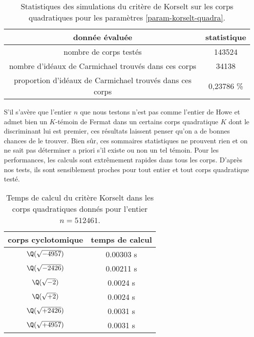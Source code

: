 \begin{table}[H]
	\begin{center}
		\begin{tabular}{|c|c|}
			\hline
			donnée évaluée & statistique \\
			\hline
			\hline
			nombre de corps testés & 143524 \\\hline
			nombre d'idéaux de Carmichael trouvés dans ces corps & 34138 \\\hline
			proportion d'idéaux de Carmichael trouvés dans ces corps & 0,23786 \% \\\hline
		\end{tabular}
		\caption{Statistiques des simulations du critère de Korselt sur les corps quadratiques pour les paramètres \ref{param-korselt-quadra}.}
	\end{center}
\end{table}

S'il s'avère que l'entier $n$ que nous testons n'est pas comme l'entier de Howe et admet bien un $K$-témoin de Fermat dans un certains corps quadratique $K$ dont le discriminant lui est premier, ces résultats laissent penser qu'on a de bonnes chances de le trouver. Bien sûr, ces sommaires statistiques ne prouvent rien et on ne sait pas déterminer a priori s'il existe ou non un tel témoin. Pour les performances, les calculs sont extrêmement rapides dans tous les corps. D'après nos tests, ils sont sensiblement proches pour tout entier et tout corps quadratique testé.

\begin{table}[H]
	\begin{center}
		\begin{tabular}{|c|c|}
			\hline
			corps cyclotomique & temps de calcul \\
			\hline
			\hline
			$\Q(\sqrt{-4957})$ & 0.00303 s \\\hline
			$\Q(\sqrt{-2426})$ & 0.00211 s \\\hline
			$\Q(\sqrt{-2})$ & 0.0024 s \\\hline
			$\Q(\sqrt{+2})$ & 0.0024 s \\\hline
			$\Q(\sqrt{+2426})$ & 0.0031 s \\\hline
			$\Q(\sqrt{+4957})$ & 0.0031 s \\\hline
		\end{tabular}
		\caption{Temps de calcul du critère Korselt dans les corps quadratiques donnés pour l'entier $n=512461$.}
	\end{center}
\end{table}
